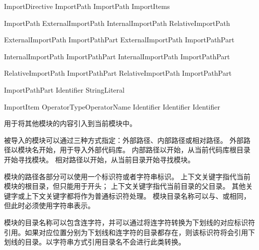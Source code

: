 \begin{bnf}{ImportDirective}
    \bnfq {} ImportPath \terminal{;} \br
    \bnfq {} ImportPath \terminal{:} ImportItems \terminal{;}
\end{bnf}

\begin{bnf}{ImportPath}
    ExternalImportPath \br
    InternalImportPath \br
    RelativeImportPath
\end{bnf}

\begin{bnf}{ExternalImportPath}
    ImportPathPart \br
    ExternalImportPath  ImportPathPart
\end{bnf}

\begin{bnf}{InternalImportPath}
      ImportPathPart \br
    InternalImportPath  ImportPathPart
\end{bnf}

\begin{bnf}{RelativeImportPath}
      ImportPathPart \br
    RelativeImportPath  ImportPathPart
\end{bnf}

\begin{bnf}{ImportPathPart}
    Identifier \br
    StringLiteral \br
\end{bnf}

\begin{bnf}{ImportItem}
    \terminal{*} \br
     \br
     OperatorType\bnfq OperatorName \br
    Identifier \br
    Identifier  Identifier
\end{bnf}

\pnum
{}用于将其他模块的内容引入到当前模块中。

\pnum
被导入的模块可以通过三种方式指定：外部路径、内部路径或相对路径。
外部路径以模块名开始，用于导入外部代码库。
内部路径以开始，从当前代码库根目录开始寻找模块。
相对路径以开始，从当前目录开始寻找模块。

\pnum
模块的路径各部分可以使用一个标识符或者字符串标识。
上下文关键字指代当前模块的根目录，但只能用于开头；
上下文关键字指代当前目录的父目录。
其他关键字或上下文关键字都将作为普通标识符处理。
模块目录名称可以与、或相同，但此时必须使用字符串表示。

\pnum
模块的目录名称可以包含连字符，并可以通过将连字符转换为下划线的对应标识符引用。如果对应位置分别为下划线和连字符的目录都存在，则该标识符将会引用下划线的目录。以字符串方式引用目录名不会进行此类转换。

